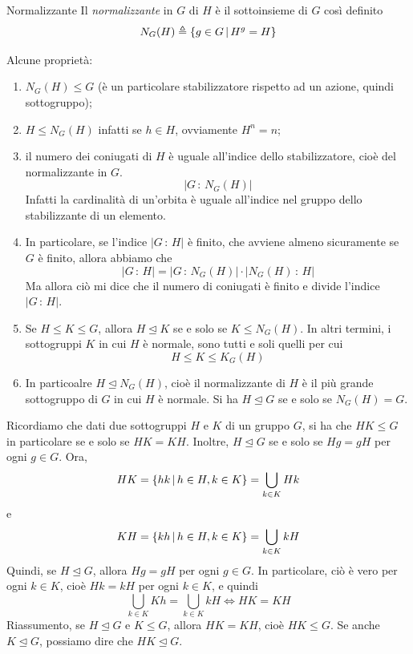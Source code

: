 \documentclass[a4paper]{article}
\begin{document}
\begin{snippetdefinition}{Normalizzante}
    Il \emph{normalizzante} in \(G\)
    di \(H\) è il sottoinsieme di \(G\) così definito
    \[
        N_G(H) \triangleq \{g\in G \,|\, H^g = H \}
    \]
\end{snippetdefinition}

Alcune proprietà:
\begin{enumerate}
    \item \(N_G(H) \leq G\) (è un particolare stabilizzatore rispetto ad un azione, quindi sottogruppo);
    \item \(H \leq N_G(H)\) infatti se \(h \in H\), ovviamente \(H^n = n\);
    \item il numero dei coniugati di \(H\) è uguale all'indice dello stabilizzatore, cioè del normalizzante in \(G\).
    \[
        |G\,:\, N_G(H)|
    \]
    Infatti la cardinalità di un'orbita è uguale all'indice nel gruppo dello stabilizzante di un elemento.
    \item In particolare, se l'indice \(|G\,:\,H|\) è finito, che avviene
    almeno sicuramente se \(G\) è finito, allora abbiamo che
    \[
        |G\,:\, H| = |G \,:\, N_G(H)| \cdot |N_G(H) \,:\, H|
    \]
    Ma allora ciò mi dice che il numero di coniugati è finito e
    divide l'indice \(|G \,:\, H|\).
    \item Se \(H \leq K \leq G\), allora \(H \unlhd K\) se e solo se
    \(K \leq N_G(H)\). In altri termini, i sottogruppi \(K\)
    in cui \(H\) è normale, sono tutti e soli quelli per cui
    \[
        H \leq K \leq K_G(H)
    \]
    \item In particoalre \(H \unlhd N_G(H)\), cioè il normalizzante
    di \(H\) è il più grande sottogruppo di \(G\) in cui \(H\) è normale.
    Si ha \(H \unlhd G\) se e solo se \(N_G(H) = G\).
\end{enumerate}

Ricordiamo che dati due sottogruppi \(H\) e \(K\) di un gruppo \(G\),
si ha che \(HK \leq G\) in particolare se e solo se
\(HK = KH\). Inoltre, \(H \unlhd G\) se e solo se \(Hg = gH\)
per ogni \(g\in G\).
Ora,
\[
    HK = \{hk \,|\, h\in H, k\in K\} = \bigcup_{k\in K} Hk
\]
e
\[
    KH = \{kh \,|\, h\in H, k\in K\} = \bigcup_{k\in K} kH
\]
Quindi, se \(H \unlhd G\), allora \(Hg = gH\)
per ogni \(g \in G\). In particolare,
ciò è vero per ogni \(k \in K\), cioè \(Hk = kH\)
per ogni \(k\in K\), e quindi
\[
    \bigcup_{k\in K} Kh = \bigcup_{k\in K} kH \iff HK = KH
\]
Riassumento, se \(H \unlhd G\) e \(K \leq G\), allora
\(HK = KH\), cioè \(HK \leq G\).
Se anche \(K \unlhd G\), possiamo dire che
\(HK \unlhd G\).
\end{document}
